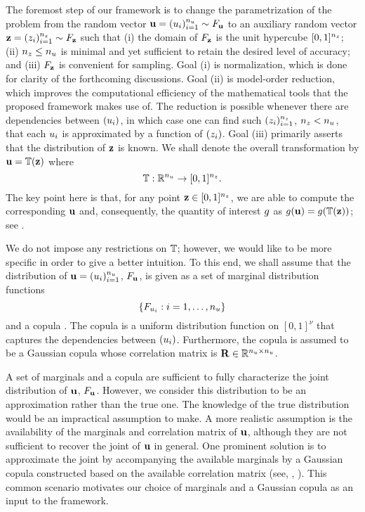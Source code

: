 The foremost step of our framework is to change the parametrization of the
problem from the random vector $\mathbf{u} = (u_i)_{i = 1}^{n_u} \sim F_{\mathbf{u}}$
to an auxiliary random vector $\mathbf{z} = (z_i)_{i = 1}^{n_z} \sim F_{\mathbf{z}}$
such that (i) the domain of $F_{\mathbf{z}}$ is the unit hypercube $[0,
1]^{n_z}$; (ii) ${n_z} \leq {n_u}$ is minimal and yet sufficient to retain the desired
level of accuracy; and (iii) $F_{\mathbf{z}}$ is convenient for sampling.
Goal (i) is normalization, which is done for clarity of the forthcoming
discussions. Goal (ii) is model-order reduction, which improves the
computational efficiency of the mathematical tools that the proposed framework
makes use of. The reduction is possible whenever there are dependencies between
$(u_i)$, in which case one can find such $(z_i)_{i = 1}^{n_z}$, ${n_z} < {n_u}$,
that each $u_i$ is approximated by a function of $(z_i)$. Goal (iii) primarily
asserts that the distribution of $\mathbf{z}$ is known. We shall denote the overall
transformation by $\mathbf{u} = \mathbb{T}(\mathbf{z})$ where
\begin{equation} \elab{transformation}
  \transformation: \real^\nu \to [0, 1]^\nz.
\end{equation}
The key point here is that, for any point $\mathbf{z} \in [0, 1]^{n_z}$, we are able to
compute the corresponding $\mathbf{u}$ and, consequently, the quantity of interest $g$
as $g(\mathbf{u}) = g(\mathbb{T}(\mathbf{z}))$; see .

We do not impose any restrictions on $\mathbb{T}$; however, we would like
to be more specific in order to give a better intuition. To this end, we shall
assume that the distribution of $\mathbf{u} = (u_i)_{i = 1}^{n_u}$, $F_{\mathbf{u}}$,
is given as a set of marginal distribution functions
\[
  \{ F_{u_i}: i = 1, \dots, {n_u} \}
\]
and a copula \cite{nelsen2006}. The copula is a uniform distribution function on
$[0, 1]^\nu$ that captures the dependencies between $(u_i)$. Furthermore, the
copula is assumed to be a Gaussian copula whose correlation matrix is
$\mathbf{R} \in \mathbb{R}^{{n_u} \times {n_u}}$.

\begin{remark}
A set of marginals and a copula are sufficient to fully characterize the joint
distribution of $\mathbf{u}$, $F_{\mathbf{u}}$. However, we consider this
distribution to be an approximation rather than the true one. The knowledge of
the true distribution would be an impractical assumption to make. A more
realistic assumption is the availability of the marginals and correlation matrix
of $\mathbf{u}$, although they are not sufficient to recover the joint of $\mathbf{u}$ in
general. One prominent solution is to approximate the joint by accompanying the
available marginals by a Gaussian copula constructed based on the available
correlation matrix (see, \eg, \cite{ukhov2014}). This common scenario motivates
our choice of marginals and a Gaussian copula as an input to the framework.
\end{remark}

